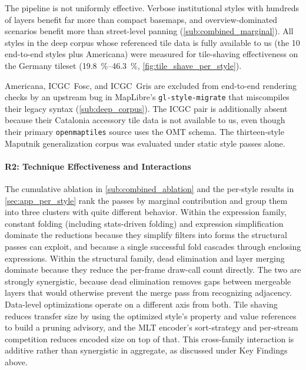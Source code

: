 The pipeline is not uniformly effective.
Verbose institutional styles with hundreds of layers benefit far more than compact basemaps, and overview-dominated scenarios benefit more than street-level panning (\cref{sub:combined_marginal}).
All styles in the deep corpus whose referenced tile data is fully available to us (the 10 end-to-end styles plus Americana) were measured for tile-shaving effectiveness on the Germany tileset (\qtyrange{19.8}{46.3}{\percent}, \cref{fig:tile_shave_per_style}).

Americana, ICGC~Fosc, and ICGC~Gris are excluded from end-to-end rendering checks by an upstream bug in MapLibre's \texttt{gl-style-migrate} that miscompiles their legacy  syntax (\cref{sub:deep_corpus}).
The ICGC pair is additionally absent because their Catalonia accessory tile data is not available to us, even though their primary \texttt{openmaptiles} source uses the OMT schema.
The thirteen-style Maputnik generalization corpus was evaluated under static style passes alone.

\paragraph{R2: Technique Effectiveness and Interactions}
The cumulative ablation in \cref{sub:combined_ablation} and the per-style results in \cref{sec:app_per_style} rank the passes by marginal contribution and group them into three clusters with quite different behavior.
Within the expression family, constant folding (including stats-driven folding) and expression simplification dominate the reductions because they simplify filters into forms the structural passes can exploit, and because a single successful fold cascades through enclosing expressions.
Within the structural family, dead elimination and layer merging dominate because they reduce the per-frame draw-call count directly.
The two are strongly synergistic, because dead elimination removes gaps between mergeable layers that would otherwise prevent the merge pass from recognizing adjacency.
Data-level optimizations operate on a different axis from both.
Tile shaving reduces transfer size by using the optimized style's property and value references to build a pruning advisory, and the \ac{MLT} encoder's sort-strategy and per-stream competition reduces encoded size on top of that.
This cross-family interaction is additive rather than synergistic in aggregate, as discussed under Key Findings above.


